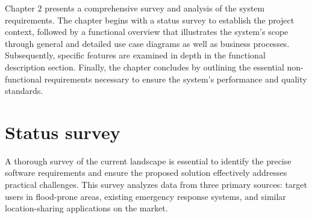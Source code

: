 \documentclass[../Main.tex]{subfiles}
\begin{document}
Chapter 2 presents a comprehensive survey and analysis of the system requirements. The chapter begins with a status survey to establish the project context, followed by a functional overview that illustrates the system's scope through general and detailed use case diagrams as well as business processes. Subsequently, specific features are examined in depth in the functional description section. Finally, the chapter concludes by outlining the essential non-functional requirements necessary to ensure the system's performance and quality standards.

\section{Status survey}
\label{section:2.1}

A thorough survey of the current landscape is essential to identify the precise software requirements and ensure the proposed solution effectively addresses practical challenges. This survey analyzes data from three primary sources: target users in flood-prone areas, existing emergency response systems, and similar location-sharing applications on the market.


\end{document}
